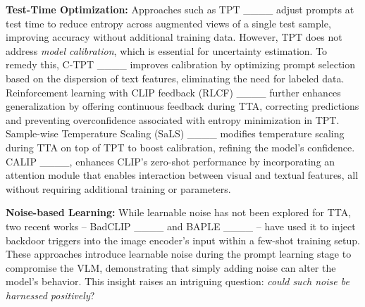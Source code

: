 \vspace{0.2cm}
\noindent\textbf{Test-Time Optimization:}
Approaches such as TPT ____ adjust prompts at test time to reduce entropy across augmented views of a single test sample, improving accuracy without additional training data. However, TPT does not address \textit{model calibration}, which is essential for uncertainty estimation.
To remedy this, C-TPT ____ improves calibration by optimizing prompt selection based on the dispersion of text features, eliminating the need for labeled data. Reinforcement learning with CLIP feedback (RLCF) ____ further enhances generalization by offering continuous feedback during TTA, correcting predictions and preventing overconfidence associated with entropy minimization in TPT. Sample-wise Temperature Scaling (SaLS) ____ modifies temperature scaling during TTA on top of TPT to boost calibration, refining the model’s confidence. CALIP ____, enhances CLIP’s zero-shot performance by incorporating an attention module that enables interaction between visual and textual features, all without requiring additional training or parameters.

\vspace{0.2cm}
\noindent\textbf{Noise-based Learning:} 
While learnable noise has not been explored for TTA, two recent works -- BadCLIP ____ and BAPLE ____ -- have used it to inject backdoor triggers into the image encoder's input within a few-shot training setup. These approaches introduce learnable noise during the prompt learning stage to compromise the VLM, demonstrating that simply adding noise can alter the model's behavior. This insight raises an intriguing question: \textit{could such noise be harnessed positively}?


